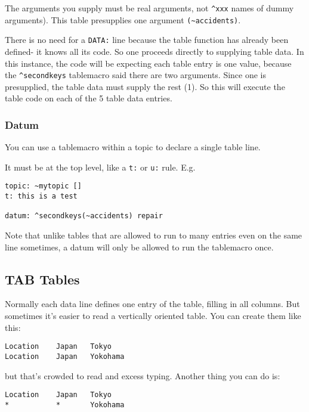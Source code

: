 \documentclass[]{article}
\begin{document}
The arguments you supply must be real arguments, not \texttt{\^{}xxx}
names of dummy arguments). This table presupplies one argument
\texttt{(\textasciitilde{}accidents)}.

There is no need for a \texttt{DATA:} line because the table function
has already been defined- it knows all its code. So one proceeds
directly to supplying table data. In this instance, the code will be
expecting each table entry is one value, because the
\texttt{\^{}secondkeys} tablemacro said there are two arguments. Since
one is presupplied, the table data must supply the rest (1). So this
will execute the table code on each of the 5 table data entries.

\subsubsection{Datum}\label{datum}

You can use a tablemacro within a topic to declare a single table line.

It must be at the top level, like a \texttt{t:} or \texttt{u:} rule.
E.g.

\begin{verbatim}
topic: ~mytopic []
t: this is a test

datum: ^secondkeys(~accidents) repair
\end{verbatim}

Note that unlike tables that are allowed to run to many entries even on
the same line sometimes, a datum will only be allowed to run the
tablemacro once.

\subsection{TAB Tables}\label{tab-tables}

Normally each data line defines one entry of the table, filling in all
columns. But sometimes it's easier to read a vertically oriented table.
You can create them like this:

\begin{verbatim}
Location    Japan   Tokyo   
Location    Japan   Yokohama
\end{verbatim}

but that's crowded to read and excess typing. Another thing you can do
is:

\begin{verbatim}
Location    Japan   Tokyo   
*           *       Yokohama
\end{verbatim}
\end{document}
